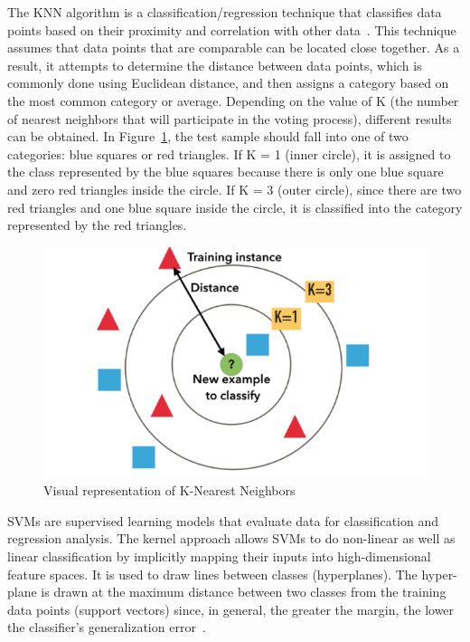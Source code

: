 The \gls{KNN} algorithm is a classification/regression technique that classifies data points based on their proximity and correlation with other data~\cite{Singh2018K-NearestPython,2020WhatIBM}. This technique assumes that data points that are comparable can be located close together. As a result, it attempts to determine the distance between data points, which is commonly done using Euclidean distance, and then assigns a category based on the most common category or average. Depending on the value of K (the number of nearest neighbors that will participate in the voting process), different results can be obtained. In Figure~\ref{fig:knn}, the test sample should fall into one of two categories: blue squares or red triangles. If K = 1 (inner circle), it is assigned to the class represented by the blue squares because there is only one blue square and zero red triangles inside the circle. If K = 3 (outer circle), since there are two red triangles and one blue square inside the circle, it is classified into the category represented by the red triangles.

\begin{figure}[htbp]
    \centering
    \includegraphics[width=0.65\linewidth]{Chapters/Figures/knn.png}
    \caption{Visual representation of K-Nearest Neighbors~\cite{Bronshtein2017AMedium}}
    \label{fig:knn}
\end{figure}

\gls{SVM}s are supervised learning models that evaluate data for classification and regression analysis. The kernel approach allows \gls{SVM}s to do non-linear as well as linear classification by implicitly mapping their inputs into high-dimensional feature spaces. It is used to draw lines between classes (hyperplanes). The hyper-plane is drawn at the maximum distance between two classes from the training data points (support vectors) since, in general, the greater the margin, the lower the classifier's generalization error~\cite{Mahesh2019MachineReview}.
    
